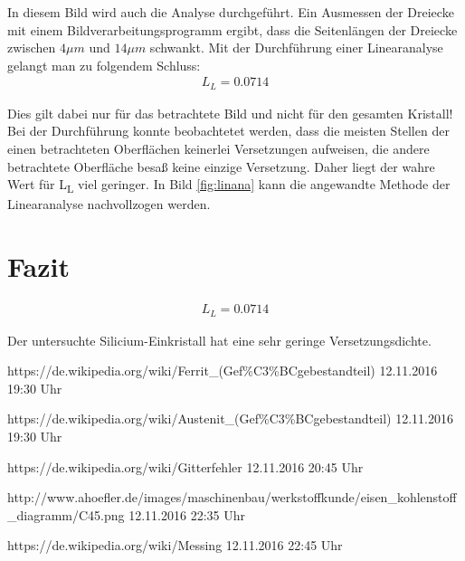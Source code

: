 \documentclass[german, %
parskip=full, %
bibliography=totoc, %
]{scrartcl}
\begin{document}
In diesem Bild wird auch die Analyse durchgeführt. Ein Ausmessen der Dreiecke mit einem Bildverarbeitungsprogramm ergibt, dass die Seitenlängen der Dreiecke zwischen $4 \mu m$ und $14 \mu m$ schwankt. Mit der Durchführung einer Linearanalyse gelangt man zu folgendem Schluss:
\begin{align*}
L_L = 0.0714
\end{align*}

Dies gilt dabei nur für das betrachtete Bild und nicht für den gesamten Kristall! Bei der Durchführung konnte beobachtetet werden, dass die meisten Stellen der einen betrachteten Oberflächen keinerlei Versetzungen aufweisen, die andere betrachtete Oberfläche besaß keine einzige Versetzung. Daher liegt der wahre Wert für L\textsubscript{L} viel geringer. In Bild \ref{fig:linana} kann die angewandte Methode der Linearanalyse nachvollzogen werden.

\section{Fazit}

\begin{align*}
L_L = 0.0714
\end{align*}

Der untersuchte Silicium-Einkristall hat eine sehr geringe Versetzungsdichte.


\begin{thebibliography}{9}

  https://de.wikipedia.org/wiki/Ferrit\_(Gef\%C3\%BCgebestandteil)
	12.11.2016
	19:30 Uhr
	
  https://de.wikipedia.org/wiki/Austenit\_(Gef\%C3\%BCgebestandteil)
	12.11.2016
	19:30 Uhr
	
  https://de.wikipedia.org/wiki/Gitterfehler
	12.11.2016
	20:45 Uhr	
	
  http://www.ahoefler.de/images/maschinenbau/werkstoffkunde/eisen\_kohlenstoff\_diagramm/C45.png
	12.11.2016
	22:35 Uhr	
	
  https://de.wikipedia.org/wiki/Messing
	12.11.2016
	22:45 Uhr	

\end{thebibliography}
\end{document}
